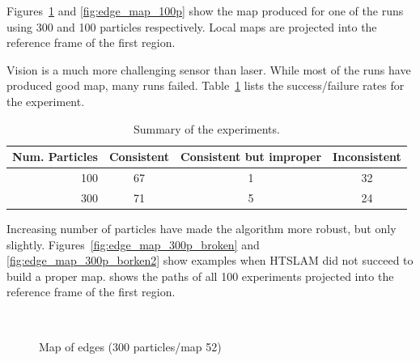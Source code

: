 Figures~\ref{fig:edge_map_300p} and \ref{fig:edge_map_100p} show the
map produced for one of the runs using 300 and 100 particles
respectively. Local maps are projected into the reference frame of the
first region. 

Vision is a much more challenging sensor than laser. While most of the
runs have produced good map, many runs
failed. Table~\ref{tab:results_vision} lists the success/failure rates
for the experiment.

\begin{table}[ht]
\center
\begin{tabular}{r|c|c|c}
Num. Particles & Consistent & Consistent but improper & Inconsistent\\
\hline
100 & 67 & 1 & 32\\
300 & 71 & 5 & 24\\
\end{tabular}
\caption{Summary of the experiments.}
\label{tab:results_vision}
\end{table}

Increasing number of particles have made the algorithm more robust,
but only slightly. Figures~\ref{fig:edge_map_300p_broken} and
\ref{fig:edge_map_300p_borken2} show examples when HTSLAM did not
succeed to build a proper map.  shows the
paths of all 100 experiments projected into the reference frame of the
first region. 


\begin{figure}[htbp]
  \centering

  \\

  \caption{Map of edges (300 particles/map 52)}
  \label{fig:edge_map_300p}
\end{figure}

